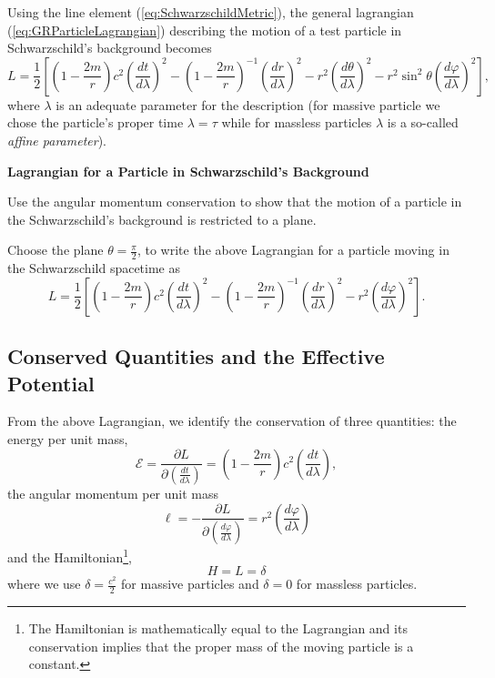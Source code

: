 Using the line element (\ref{eq:SchwarzschildMetric}), the general lagrangian (\ref{eq:GRParticleLagrangian}) describing the motion of a test particle in Schwarzschild's background becomes 
\begin{equation}
L  =\frac{1}{2} \left[ \left(1 - \frac{2m}{r} \right) c^2 \left( \frac{dt}{d\lambda} \right)^2 - \left( 1 - \frac{2m}{r} \right)^{-1} \left( \frac{dr}{d\lambda} \right)^2 - r^2 \left( \frac{d\theta }{d\lambda}  \right)^2  - r^2 \sin^2 \theta\left( \frac{d\varphi }{d\lambda} \right)^2 \right],
\end{equation}
where $\lambda$ is an adequate parameter for the description (for massive particle we chose the particle's proper time $\lambda = \tau$ while for massless particles $\lambda$ is a so-called \textit{affine parameter}).

\begin{exercise}
\textbf{Lagrangian for a Particle in Schwarzschild's Background}

Use the angular momentum conservation to show that the motion of a particle in the Schwarzschild's background is restricted to a plane. 

Choose the plane $\theta = \frac{\pi}{2}$, to write the above Lagrangian for a particle moving in the Schwarzschild spacetime as
\begin{equation}
L =\frac{1}{2} \left[ \left(1 - \frac{2m}{r} \right) c^2 \left( \frac{dt}{d\lambda} \right)^2 - \left( 1 - \frac{2m}{r} \right)^{-1} \left( \frac{dr}{d\lambda} \right)^2 - r^2 \left( \frac{d\varphi }{d\lambda} \right)^2 \right]. \label{eq:SchwarzschildMotionLagrangian}
\end{equation}
\end{exercise}

\subsection{Conserved Quantities and the Effective Potential}
From the above Lagrangian, we identify the conservation of three quantities: the energy per unit mass,
\begin{equation}
\mathcal{E} = \frac{\partial L}{\partial \left( \frac{dt}{d\lambda}\right)} =  \left(1 - \frac{2m}{r} \right) c^2 \left( \frac{dt}{d\lambda} \right),\label{eq:SchwarzschildConservedEnergy}
\end{equation}
the angular momentum per unit mass
\begin{equation}
\ell = - \frac{\partial L}{\partial \left( \frac{d\varphi }{d\lambda}\right)} = r^2 \left( \frac{d\varphi }{d\lambda} \right)
\end{equation}
and the Hamiltonian\footnote{The Hamiltonian is mathematically equal to the Lagrangian and its conservation implies that the proper mass of the moving particle is a constant.},
\begin{equation}
H = L = \delta
\end{equation}
where we use $\delta = \frac{c^2}{2}$ for massive particles and $\delta=0$ for massless particles. 

